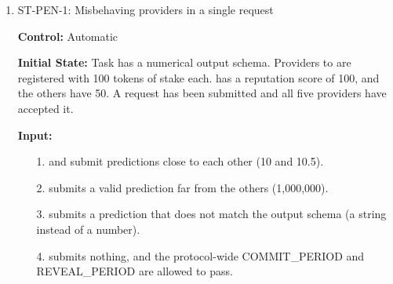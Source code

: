 \documentclass[12pt]{article}
\newcommand{\rref}[1]{FR\ref{#1}}
\newcommand{\fixture}[1]{\texttt{\seqsplit{#1}}}
\begin{document}
\begin{enumerate}
\textbf{Test Case Derivation:} This case inherits the pinned reward amounts and
post-update reputation snapshot from ST-REP-1 under
\rref{FR_UpdateProviderReputations} and \rref{FR_DistributeRewards}; the
provider accounts that cannot receive tokens affect transfer status, not the
calculated shares. \rref{FR_RewardTransferFailure} requires a failed transfer
to be held in escrow and recorded as unresolved, with the request set to
Pending Transfer, while other
transfers and the result are not affected. \rref{FR_PendingTransferNotice} requires a notification and the
dashboard details. \rref{FR_PendingTransferRetry} allows the provider to retry before the deadline, and
\rref{FR_PendingTransferDeadline} requires the held reward to be burned at the deadline. \rref{FR_RequestCompletion} only
allows the request to become Completed once every transfer has succeeded or
been forfeited, which is why it stays in Pending Transfer after
\fixture{P2}'s retry.

\textbf{How test will be performed:} After each input step, read the request's
status, the escrow balance, each provider's token balance, the transfer
records, and the total burned supply from the blockchain, and check each
provider's notifications and dashboard in the application.

\item{ST-PEN-1: Misbehaving providers in a single request\\}

\textbf{Control:} Automatic

\textbf{Initial State:} Task \fixture{Penalty-Test-Task} has a numerical output schema.
Providers \fixture{P1} to \fixture{P5} are registered with 100 tokens of stake
each. \fixture{P1} has a reputation score of 100, and the others have 50. A
request has been submitted and all five providers have accepted it.

\textbf{Input:}
\begin{itemize}
\item[1.] \fixture{P1} and \fixture{P2} submit predictions close to each other (10
and 10.5).
\item[2.] \fixture{P3} submits a valid prediction far from the others
(1{,}000{,}000).
\item[3.] \fixture{P4} submits a prediction that does not match the output schema (a
string instead of a number).
\item[4.] \fixture{P5} submits nothing, and the protocol-wide COMMIT\_PERIOD and REVEAL\_PERIOD are allowed
to pass.
\end{itemize}


\end{enumerate}
\end{document}
